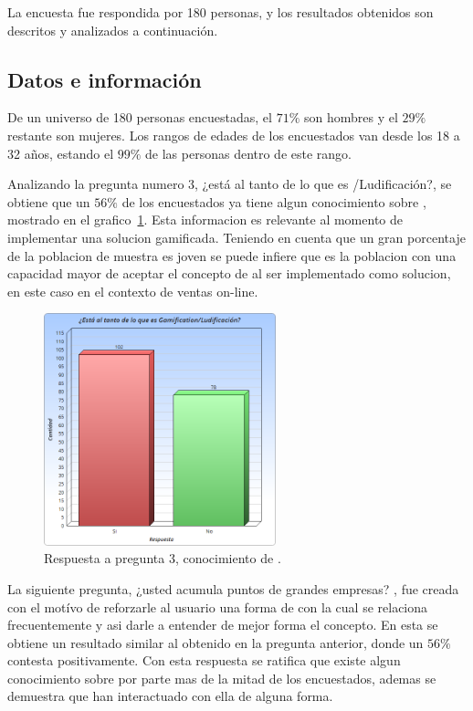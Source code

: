 La encuesta fue respondida por 180 personas, y los resultados obtenidos son descritos y
analizados a continuación.

\subsection{Datos e información}

De un universo de 180 personas encuestadas, el $71\%$ son hombres y el $29\%$ restante son mujeres.
Los rangos de edades de los encuestados van desde los 18 a 32 años, estando el $99\%$ de las personas
dentro de este rango.

Analizando la pregunta numero 3, ¿está al tanto de lo que es {\GAM}/Ludificación?, se obtiene que
 un $56\%$ de los encuestados ya tiene algun conocimiento sobre {\GAM}, mostrado en el grafico~\ref{fig:chart5.1}.
Esta informacion es relevante al momento de implementar una solucion gamificada. 
Teniendo en cuenta que un gran porcentaje de la poblacion de muestra es joven se puede infiere 
que es la poblacion con una capacidad mayor de aceptar el concepto de {\GAM} al ser implementado 
como solucion, en este caso en el contexto de ventas on-line.

\begin{figure}[!htb]
  \centering
  \includegraphics[width=0.6\textwidth]{images/Graficos/graf_5_1.png}
  \caption[chart5.1]{Respuesta a pregunta $3$, conocimiento de {\GAM}.}
  \label{fig:chart5.1}
\end{figure}

La siguiente pregunta, ¿usted acumula puntos de grandes empresas? , fue creada con el motívo de 
reforzarle al usuario una forma de {\GAM} con la cual se relaciona frecuentemente y asi darle
a entender de mejor forma el concepto. En esta se obtiene un resultado similar al obtenido en 
la pregunta anterior, donde un $56\%$ contesta positivamente. Con esta respuesta se ratifica que existe
algun conocimiento sobre {\GAM} por parte mas de la mitad de los encuestados, ademas se demuestra que
han interactuado con ella de alguna forma.

